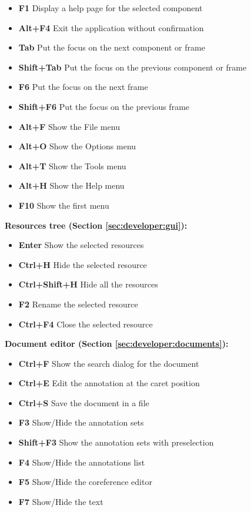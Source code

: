\begin{itemize}
\item {\bf F1} Display a help page for the selected component
\item {\bf Alt+F4} Exit the application without confirmation
\item {\bf Tab} Put the focus on the next component or frame
\item {\bf Shift+Tab} Put the focus on the previous component or frame
\item {\bf F6} Put the focus on the next frame
\item {\bf Shift+F6} Put the focus on the previous frame
\item {\bf Alt+F} Show the File menu
\item {\bf Alt+O} Show the Options menu
\item {\bf Alt+T} Show the Tools menu
\item {\bf Alt+H} Show the Help menu
\item {\bf F10} Show the first menu
\end{itemize}


{\bf Resources tree (Section \ref{sec:developer:gui}):}

\begin{itemize}
\item {\bf Enter} Show the selected resources
\item {\bf Ctrl+H} Hide the selected resource
\item {\bf Ctrl+Shift+H} Hide all the resources
\item {\bf F2} Rename the selected resource
\item {\bf Ctrl+F4} Close the selected resource
\end{itemize}

{\bf Document editor (Section \ref{sec:developer:documents}):}

\begin{itemize}
\item {\bf Ctrl+F} Show the search dialog for the document
\item {\bf Ctrl+E} Edit the annotation at the caret position
\item {\bf Ctrl+S} Save the document in a file
\item {\bf F3} Show/Hide the annotation sets
\item {\bf Shift+F3} Show the annotation sets with preselection
\item {\bf F4} Show/Hide the annotations list
\item {\bf F5} Show/Hide the coreference editor
\item {\bf F7} Show/Hide the text
\end{itemize}

